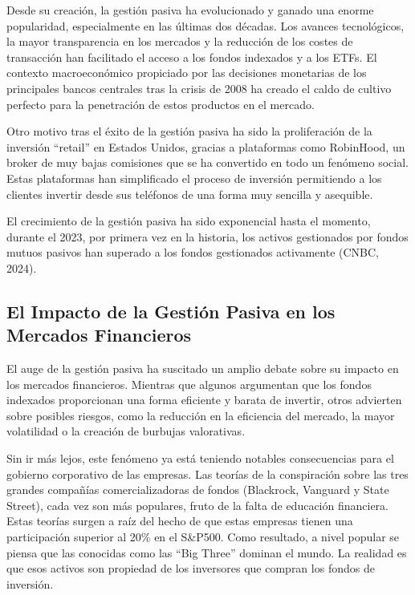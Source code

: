 \documentclass[12pt,a4paper]{article}
\begin{document}
Desde su creación, la gestión pasiva ha evolucionado y ganado una enorme popularidad, especialmente en las últimas dos décadas. Los avances tecnológicos, la mayor transparencia en los mercados y la reducción de los costes de transacción han facilitado el acceso a los fondos indexados y a los ETFs. El contexto macroeconómico propiciado por las decisiones monetarias de los principales bancos centrales tras la crisis de 2008 ha creado el caldo de cultivo perfecto para la penetración de estos productos en el mercado.

Otro motivo tras el éxito de la gestión pasiva ha sido la proliferación de la inversión ``retail'' en Estados Unidos, gracias a plataformas como RobinHood, un broker de muy bajas comisiones que se ha convertido en todo un fenómeno social. Estas plataformas han simplificado el proceso de inversión permitiendo a los clientes invertir desde sus teléfonos de una forma muy sencilla y asequible.

El crecimiento de la gestión pasiva ha sido exponencial hasta el momento, durante el 2023, por primera vez en la historia, los activos gestionados por fondos mutuos pasivos han superado a los fondos gestionados activamente (CNBC, 2024).

\subsection{El Impacto de la Gestión Pasiva en los Mercados Financieros}

El auge de la gestión pasiva ha suscitado un amplio debate sobre su impacto en los mercados financieros. Mientras que algunos argumentan que los fondos indexados proporcionan una forma eficiente y barata de invertir, otros advierten sobre posibles riesgos, como la reducción en la eficiencia del mercado, la mayor volatilidad o la creación de burbujas valorativas.

Sin ir más lejos, este fenómeno ya está teniendo notables consecuencias para el gobierno corporativo de las empresas. Las teorías de la conspiración sobre las tres grandes compañías comercializadoras de fondos (Blackrock, Vanguard y State Street), cada vez son más populares, fruto de la falta de educación financiera. Estas teorías surgen a raíz del hecho de que estas empresas tienen una participación superior al 20\% en el S\&P500. Como resultado, a nivel popular se piensa que las conocidas como las ``Big Three'' dominan el mundo. La realidad es que esos activos son propiedad de los inversores que compran los fondos de inversión.
\end{document}
